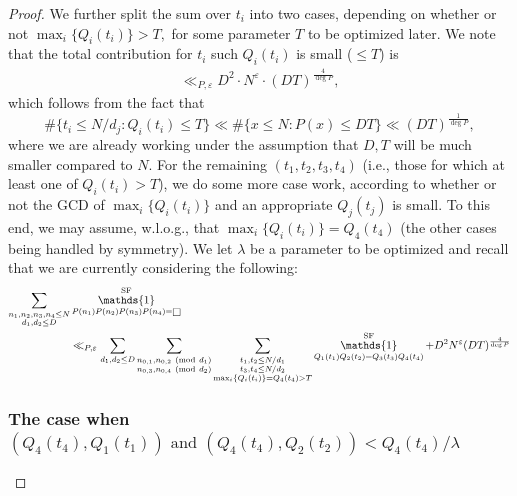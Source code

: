 \documentclass[11pts]{amsart}
\numberwithin{equation}{section}
\DeclareMathOperator{\one}{\mathds{1}}
\let\oldsquare\square
\renewcommand{\square}[1][-1pt]{%
 {\raisebox{#1}{$\oldsquare$}}%
}
\newcommand{\Mod}[1]{\ (\text{mod}\ #1)}
\begin{document}
\begin{proof}
        We further split the sum over $t_i$ into two cases, depending on whether or not $\max_i\{Q_i(t_i)\}>T,$ for some parameter $T$ to be optimized later. We note that the total contribution for $t_i$ such $Q_i(t_i)$ is small ($\leq T$) is
        \begin{align}
            \ll_{P,\varepsilon} D^2\cdot N^\varepsilon\cdot (DT)^{\frac{4}{\deg P}},
        \end{align}
        which follows from the fact that
        \[
        \#\{t_i\leq N/d_{j}: Q_i(t_i)\leq T\}\ll \#\{x\leq N:P(x)\leq DT\}\ll (DT)^{\frac{1}{\deg P}},
        \]
        where we are already working under the assumption that $D,T$ will be much smaller compared to $N$. For the remaining $(t_1,t_2,t_3,t_4)$ (i.e., those for which at least one of $Q_i(t_i)>T$), we do some more case work, according to whether or not the GCD of $\max_i\{Q_i(t_i)\}$ and an appropriate $Q_j(t_j)$ is small. To this end, we may assume, w.l.o.g., that $\max_i\{Q_i(t_i)\}=Q_4(t_4)$ (the other cases being handled by symmetry). We let $\lambda$ be a parameter to be optimized and recall that we are currently considering the following:
        \begin{align}
        \label{Important_Equation}
            \sum_{\substack{{n_1,n_2,n_3,n_4\leq N}\\{d_1,d_2\leq D}}}&\one_{P(n_1)P(n_2)P(n_3)P(n_4)=\square}^{\text{SF}}\\
            &\ll_{P,\varepsilon}
             \sum_{d_1,d_2\leq D}
            \sum_{\substack{{n_{0,1},n_{0,2}\Mod{d_1}}\\{n_{0,3},n_{0,4}\Mod{d_2}}}}
            \sum_{\substack{{t_1,t_2\leq N/d_1}\\{t_3,t_4\leq N/d_2}\\{\max_i\{Q_i(t_i)\}=Q_4(t_4)>T}}}\one_{Q_1(t_1)Q_2(t_2)=Q_3(t_3)Q_4(t_4)}^{\text{SF}}
            +
            D^2N^{\varepsilon}(DT)^{\frac{4}{\deg P}}           
        \end{align}

            \subsubsection{The case when $(Q_4(t_4),Q_1(t_1)) \text{ and }(Q_4(t_4),Q_2(t_2))<Q_4(t_4)/\lambda$}
            

\end{proof}
\end{document}
